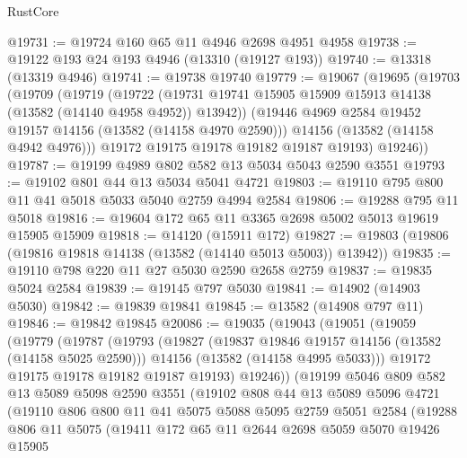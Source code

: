 \begin{lexlean}{RustCore}
\begin{coremodule}
@19731 := @19724 @160 @65 @11 @4946 @2698 @4951 @4958
@19738 := @19122 @193 @24 @193 @4946 (@13310 (@19127 @193))
@19740 := @13318 (@13319 @4946)
@19741 := @19738 @19740
@19779 := @19067
    (@19695
      (@19703
        (@19709
          (@19719
            (@19722
              (@19731 @19741 @15905 @15909 @15913 @14138 (@13582 (@14140 @4958 @4952)) @13942))
            (@19446 @4969 @2584 @19452 @19157 @14156 (@13582 (@14158 @4970 @2590)))
            @14156
            (@13582 (@14158 @4942 @4976)))
          @19172
          @19175
          @19178
          @19182
          @19187
          @19193)
        @19246))
@19787 := @19199 @4989 @802 @582 @13 @5034 @5043 @2590 @3551
@19793 := @19102 @801 @44 @13 @5034 @5041 @4721
@19803 := @19110 @795 @800 @11 @41 @5018 @5033 @5040 @2759 @4994 @2584
@19806 := @19288 @795 @11 @5018
@19816 := @19604 @172 @65 @11 @3365 @2698 @5002 @5013 @19619 @15905 @15909
@19818 := @14120 (@15911 @172)
@19827 := @19803 (@19806 (@19816 @19818 @14138 (@13582 (@14140 @5013 @5003)) @13942))
@19835 := @19110 @798 @220 @11 @27 @5030 @2590 @2658 @2759
@19837 := @19835 @5024 @2584
@19839 := @19145 @797 @5030
@19841 := @14902 (@14903 @5030)
@19842 := @19839 @19841
@19845 := @13582 (@14908 @797 @11)
@19846 := @19842 @19845
@20086 := @19035
    (@19043
      (@19051
        (@19059
          (@19779
            (@19787
              (@19793
                (@19827
                  (@19837 @19846 @19157 @14156 (@13582 (@14158 @5025 @2590)))
                  @14156
                  (@13582 (@14158 @4995 @5033)))
                @19172
                @19175
                @19178
                @19182
                @19187
                @19193)
              @19246))
          (@19199
            @5046
            @809
            @582
            @13
            @5089
            @5098
            @2590
            @3551
            (@19102
              @808
              @44
              @13
              @5089
              @5096
              @4721
              (@19110
                @806
                @800
                @11
                @41
                @5075
                @5088
                @5095
                @2759
                @5051
                @2584
                (@19288
                  @806
                  @11
                  @5075
                  (@19411
                    @172
                    @65
                    @11
                    @2644
                    @2698
                    @5059
                    @5070
                    @19426
                    @15905

\end{coremodule}
\end{lexlean}
